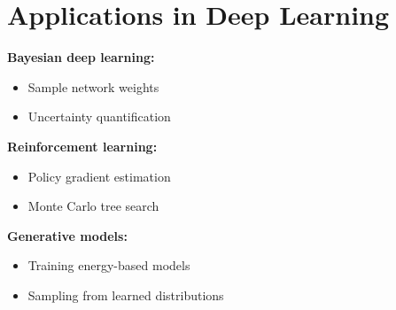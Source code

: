 
\section{Applications in Deep Learning}
\label{sec:mc-applications}

\textbf{Bayesian deep learning:}
\begin{itemize}
    \item Sample network weights
    \item Uncertainty quantification
\end{itemize}

\textbf{Reinforcement learning:}
\begin{itemize}
    \item Policy gradient estimation
    \item Monte Carlo tree search
\end{itemize}

\textbf{Generative models:}
\begin{itemize}
    \item Training energy-based models
    \item Sampling from learned distributions
\end{itemize}
